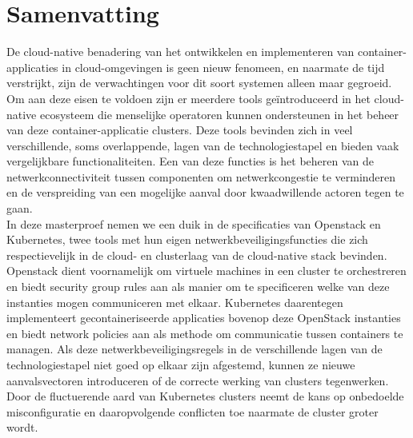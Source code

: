 \chapter{Samenvatting}                                 \label{ch:abstractNL}

De cloud-native benadering van het ontwikkelen en implementeren van container-applicaties in cloud-omgevingen is geen nieuw fenomeen, en naarmate de tijd verstrijkt, zijn de verwachtingen voor dit soort systemen alleen maar gegroeid. Om aan deze eisen te voldoen zijn er meerdere tools geïntroduceerd in het cloud-native ecosysteem die menselijke operatoren kunnen ondersteunen in het beheer van deze container-applicatie clusters. Deze tools bevinden zich in veel verschillende, soms overlappende, lagen van de technologiestapel en bieden vaak vergelijkbare functionaliteiten. Een van deze functies is het beheren van de netwerkconnectiviteit tussen componenten om netwerkcongestie te verminderen en de verspreiding van een mogelijke aanval door kwaadwillende actoren tegen te gaan.\\[10pt]


In deze masterproef nemen we een duik in de specificaties van Openstack en Kubernetes, twee tools met hun eigen netwerkbeveiligingsfuncties die zich respectievelijk in de cloud- en clusterlaag van de cloud-native stack bevinden. Openstack dient voornamelijk om virtuele machines in een cluster te orchestreren en biedt security group rules aan als manier om te specificeren welke van deze instanties mogen communiceren met elkaar. Kubernetes daarentegen implementeert gecontaineriseerde applicaties bovenop deze OpenStack instanties en biedt network policies aan als methode om communicatie tussen containers te managen. Als deze netwerkbeveiligingsregels in de verschillende lagen van de technologiestapel niet goed op elkaar zijn afgestemd, kunnen ze nieuwe aanvalsvectoren introduceren of de correcte werking van clusters tegenwerken. Door de fluctuerende aard van Kubernetes clusters neemt de kans op onbedoelde misconfiguratie en daaropvolgende conflicten toe naarmate de cluster groter wordt.
\\[10pt]


